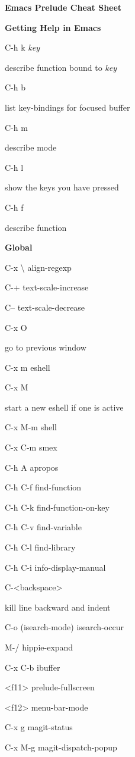 \documentclass[10pt]{article}
\renewcommand\section[1]{\bigskip\par\textbf{\color{heading}\large#1}\smallskip}
\newcommand\humanreadable[1]{{\par\color{default}\small\sffamily#1}}
\newcommand\meta[1]{\textlangle\textit{#1}\textrangle}
\renewcommand\section[1]{\bigskip\par\textbf{\color{heading}\large#1}\smallskip}
\newcommand\humanreadable[1]{{\par\color{orange}\small\sffamily#1}}
\newcommand\meta[1]{\textlangle\textit{#1}\textrangle}
\begin{document}
\begin{multicols}{4}

  \setlength{\columnsep}{1cm}
  \begin{center}
    \LARGE\color{heading}\textbf{Emacs Prelude Cheat Sheet}
  \end{center}

  \section{Getting Help in Emacs}
  \begin{keylist}
  \item[C-h k \meta{key}] \humanreadable{describe function bound to \meta{key}}
  \item[C-h b] \humanreadable{list key-bindings for focused buffer}
  \item[C-h m] \humanreadable{describe mode}
  \item[C-h l] \humanreadable{show the keys you have pressed}
  \item[C-h f] \humanreadable{describe function}
  \end{keylist}

  \section{Global}
  \begin{keylist}
  \item[C-x \textbackslash] align-regexp
  \item[C-+] text-scale-increase
  \item[C--] text-scale-decrease
  \item[C-x O] \humanreadable{go to previous window}
  \item[C-x m] eshell
  \item[C-x M] \humanreadable{start a new eshell if one is active}
  \item[C-x M-m] shell
  \item[C-x C-m] smex
  \item[C-h A] apropos
  \item[C-h C-f] find-function
  \item[C-h C-k] find-function-on-key
  \item[C-h C-v] find-variable
  \item[C-h C-l] find-library
  \item[C-h C-i] info-display-manual
  \item[C-<backspace>] \humanreadable{kill line backward and indent}
  \item[C-o] (isearch-mode) isearch-occur
  \item[M-/] hippie-expand
  \item[C-x C-b] ibuffer
  \item[<f11>] prelude-fullscreen
  \item[<f12>] menu-bar-mode
  \item[C-x g] magit-status
  \item[C-x M-g] magit-dispatch-popup
  \end{keylist}


\end{multicols}
\end{document}
